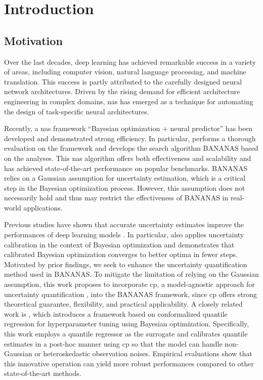 \documentclass[a4paper,oneside,bibliography=totoc]{scrbook}
\begin{document}
\begingroup%
\hypersetup{hidelinks} %
\tableofcontents%
\endgroup


\mainmatter  %

\chapter{Introduction}
\label{ch:intro}

\section{Motivation}
Over the last decades, deep learning has achieved remarkable success in a variety of areas, including computer vision, natural language processing, and machine translation. This success is partly attributed to the carefully designed neural network architectures. Driven by the rising demand for efficient architecture engineering in complex domains, \gls{nas} has emerged as a technique for automating the design of task-specific neural architectures.

Recently, a \gls{nas} framework “Bayesian optimization + neural predictor” has been developed and demonstrated strong efficiency. In particular, \cite{white2019bananas}  performs a thorough evaluation on the framework and develops the search algorithm BANANAS based on the analyses. This \gls{nas} algorithm offers both effectiveness and scalability and has achieved state-of-the-art performance on popular benchmarks. BANANAS relies on a Gaussian assumption for uncertainty estimation, which is a critical step in the Bayesian optimization process. However, this assumption does not necessarily hold and thus may restrict the effectiveness of BANANAS in real-world applications.

Previous studies have shown that accurate uncertainty estimates improve the performances of deep learning models \cite{pmlr-v80-kuleshov18a}. In particular, \cite{deshpande2024online} also applies uncertainty calibration in the context of Bayesian optimization and demonstrates that calibrated Bayesian optimization converges to better optima in fewer steps. Motivated by prior findings, we seek to enhance the uncertainty quantification method used in BANANAS. To mitigate the limitation of relying on the Gaussian assumption, this work proposes to incorporate \gls{cp},  a model-agnostic approach for uncertainty quantification \cite{shafer2008tutorial, vovk2005algorithmic}, into the BANANAS framework, since \gls{cp} offers strong theoretical guarantee, flexibility, and practical applicability. A closely related work is \cite{salinas2023optimizing}, which introduces a framework based on conformalized quantile regression for hyperparameter tuning using Bayesian optimization. Specifically, this work employs a quantile regressor as the surrogate and calibrates quantile estimates in a post-hoc manner using \gls{cp} so that the model can handle non-Gaussian or heteroskedastic observation noises. Empirical evaluations show that this innovative operation can yield more robust performances compared to other state-of-the-art methods.
\end{document}
